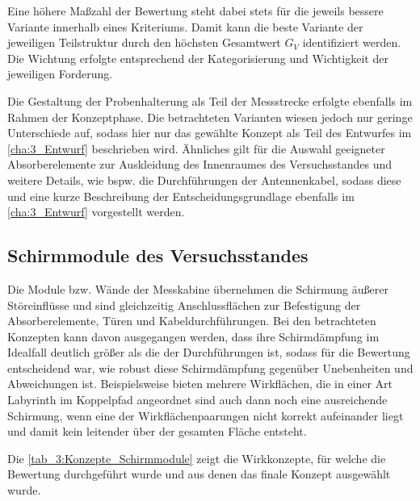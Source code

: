 Eine höhere Maßzahl der Bewertung steht dabei stets für die jeweils bessere Variante innerhalb eines Kriteriums. Damit kann die beste Variante der jeweiligen Teilstruktur durch den höchsten Gesamtwert $G_V$ identifiziert werden. Die Wichtung erfolgte entsprechend der Kategorisierung und Wichtigkeit der jeweiligen Forderung.
\par
\vspace{\linespace}
Die Gestaltung der Probenhalterung als Teil der Messstrecke erfolgte ebenfalls im Rahmen der Konzeptphase. Die betrachteten Varianten wiesen jedoch nur geringe Unterschiede auf, sodass hier nur das gewählte Konzept als Teil des Entwurfes im \Abschnitt\ref{cha:3_Entwurf} beschrieben wird. Ähnliches gilt für die Auswahl geeigneter Absorberelemente zur Auskleidung des Innenraumes des Versuchsstandes und weitere Details, wie bspw. die Durchführungen der Antennenkabel, sodass diese und eine kurze Beschreibung der Entscheidungsgrundlage ebenfalls im \Abschnitt\ref{cha:3_Entwurf} vorgestellt werden.


\subsection{Schirmmodule des Versuchsstandes}\label{cha:3_sub_Schirmmodule_Versuchsstand}

Die Module bzw. Wände der Messkabine übernehmen die Schirmung äußerer Störeinflüsse und sind gleichzeitig Anschlussflächen zur Befestigung der Absorberelemente, Türen und Kabeldurchführungen. Bei den betrachteten Konzepten kann davon ausgegangen werden, dass ihre Schirmdämpfung im Idealfall deutlich größer als die der Durchführungen ist, sodass für die Bewertung entscheidend war, wie robust diese Schirmdämpfung gegenüber Unebenheiten und Abweichungen ist. Beispielsweise bieten mehrere Wirkflächen, die in einer Art Labyrinth im Koppelpfad angeordnet sind auch dann noch eine ausreichende Schirmung, wenn eine der Wirkflächenpaarungen nicht korrekt aufeinander liegt und damit kein leitender über der gesamten Fläche entsteht. 
\par
\vspace{\linespace}
Die \Tabelle\ref{tab_3:Konzepte_Schirmmodule} zeigt die Wirkkonzepte, für welche die Bewertung durchgeführt wurde und aus denen das finale Konzept ausgewählt wurde. 


